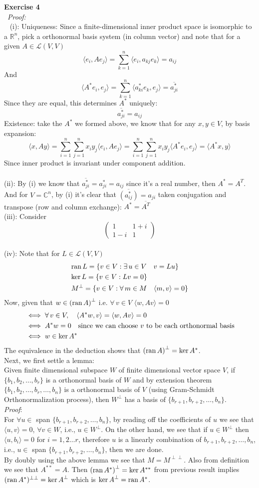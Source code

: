 \documentclass[12pt]{article}
\def\dotp#1#2{\langle#1,#2\rangle}
\def\ss#1#2{\sum_{#1=1}^{#2}}
\def\ep#1#2{{\bf Exercise #1}\\~{\it Proof:}\\~#2\\[1em]}
\def\inn#1#2{(#1): #2\\[0.5em]}
\def\ran#1{{\rm ran}\,#1}
\def\ker#1{{\rm ker}\,#1}
\newcommand{\eq}[1]{\begin{align*}#1\end{align*}}
\begin{document}
\ep{4}{
	\inn{i}{
	Uniqueness:
	Since a finite-dimensional inner product space is isomorphic to a $\mathbb{R}^n$, pick a orthonormal basis system (in column vector) and note that for a given $A\in\mathcal{L}(V,V)$
	\[
	\dotp{e_i}{Ae_j}=\ss{k}{n}\dotp{e_i}{a_{kj}e_k}=a_{ij}
	\]
	And
	\[
	\dotp{A^*e_i}{e_j}=\ss{k}{n}\dotp{a^*_{ki}e_k}{e_j}=\overline{a^*_{ji}}
	\]
	Since they are equal, this determines $A^*$ uniquely:
	\[
	\overline{a^*_{ji}}=a_{ij}
	\]
	Existence: take the $A^*$ we formed above, we know that for any $x,y\in V$, by basis expansion:
	\[
	\dotp{x}{Ay}=\ss{i}{n}\ss{j}{n}x_iy_j\dotp{e_i}{Ae_j}=\ss{i}{n}\ss{j}{n}x_iy_j\dotp{A^*e_i}{e_j}=\dotp{A^*x}{y}
	\]
	Since inner product is invariant under component addition.\\
	}
	\inn{ii}{
	By (i) we know that $\overline{a^*_{ji}}=a^*_{ji}=a_{ij}$ since it's a real number, then $A^*=A^T$. And for $V=\mathbb{C}^n$, by (i) it's clear that $\overline{(a^*_{ij})}=a_{ji}$ taken conjugation and transpose (row and column exchange): $A^*=\overline{A^T}$
	}
	\inn{iii}{
	Consider
	\[
	\begin{pmatrix}
	1&1+i\\
	1-i&1
	\end{pmatrix}
	\]
	}
	\inn{iv}{
	Note that for $L\in\mathcal{L}(V,V)$
	\begin{align*}
	&{\rm ran}\,L=\{v\in V:\exists\,{u\in V}\quad v=Lu\}\\
	&{\rm ker}\,L=\{v\in V:Lv=0\}\\
	&M^{\perp}=\{v\in V:\forall\,m\in M\quad\dotp{m}{v}=0\}
	\end{align*}
	Now, given that $w\in{(\ran{A})}^{\perp}$ i.e. $\forall\,v\in V$ $\dotp{w}{Av}=0$
	\eq{
	&\iff \forall\, v\in V,\quad\dotp{A^*w}{v}=\dotp{w}{Av}=0\\
	&\iff A^*w=0\quad\hbox{since we can choose $v$ to be each orthonormal  basis}\\
	&\iff w\in\ker{A^*}
	}
	The equivalence in the deduction shows that ${(\ran{A})}^{\perp}=\ker{A^*}$.\\
	Next, we first settle a lemma:\\
	Given finite dimensional subspace $W$ of finite dimensional vector space $V$, if $\{b_1,b_2,\ldots,b_r\}$ is a  orthonormal basis of $W$ and by extension theorem $\{b_1,b_2,\ldots,b_r,\ldots,b_n\}$ is a orthonormal basis of $V$ (using Gram-Schmidt Orthonormalization process), then $W^{\perp}$ has a basis of $\{b_{r+1},b_{r+2},\ldots,b_n\}$.\\
	\hbox{\it Proof}:\\
	For $\forall u\in$ span $\{b_{r+1},b_{r+2},\ldots,b_n\}$, by reading off the coefficients of $u$ we see that $\dotp{u}{v}=0$, $\forall v\in W$, i.e., $u\in W^{\perp}$. On the other hand, we see that if $u\in W^{\perp}$ then $\dotp{u}{b_i}=0$ for $i=1,2\ldots r$, therefore $u$ is a linearly combination of $b_{r+1},b_{r+2},\ldots,b_n$, i.e., $u\in$ span $\{b_{r+1},b_{r+2},\ldots,b_n\}$, then we are done.\\
	By doubly using the above lemma we see that $M=M^{\perp\perp}$. Also from definition we see that $A^{**}=A$. Then ${(\ran{A^*})}^{\perp}=\ker{A^{**}}$ from previous result implies $(\ran A^*)^{\perp\perp}={\ker{A}}^{\perp}$ which is ${\ker{A}}^{\perp}=\ran A^*$.
	}
}
\end{document}
